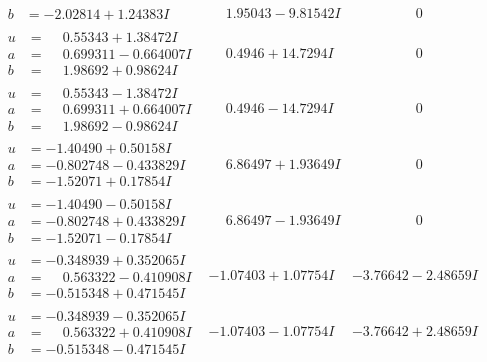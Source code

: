 \documentclass[1p]{elsarticle_modified}
\theoremstyle{definition}
\begin{document}
$$\begin{array}{c|c|c}
\begin{aligned}
b &= -2.02814 + 1.24383 I\end{aligned}
 & \phantom{-}1.95043 - 9.81542 I & \phantom{-0.000000 } 0 \\ \hline\begin{aligned}
u &= \phantom{-}0.55343 + 1.38472 I \\
a &= \phantom{-}0.699311 - 0.664007 I \\
b &= \phantom{-}1.98692 + 0.98624 I\end{aligned}
 & \phantom{-}0.4946 + 14.7294 I & \phantom{-0.000000 } 0 \\ \hline\begin{aligned}
u &= \phantom{-}0.55343 - 1.38472 I \\
a &= \phantom{-}0.699311 + 0.664007 I \\
b &= \phantom{-}1.98692 - 0.98624 I\end{aligned}
 & \phantom{-}0.4946 - 14.7294 I & \phantom{-0.000000 } 0 \\ \hline\begin{aligned}
u &= -1.40490 + 0.50158 I \\
a &= -0.802748 - 0.433829 I \\
b &= -1.52071 + 0.17854 I\end{aligned}
 & \phantom{-}6.86497 + 1.93649 I & \phantom{-0.000000 } 0 \\ \hline\begin{aligned}
u &= -1.40490 - 0.50158 I \\
a &= -0.802748 + 0.433829 I \\
b &= -1.52071 - 0.17854 I\end{aligned}
 & \phantom{-}6.86497 - 1.93649 I & \phantom{-0.000000 } 0 \\ \hline\begin{aligned}
u &= -0.348939 + 0.352065 I \\
a &= \phantom{-}0.563322 - 0.410908 I \\
b &= -0.515348 + 0.471545 I\end{aligned}
 & -1.07403 + 1.07754 I & -3.76642 - 2.48659 I \\ \hline\begin{aligned}
u &= -0.348939 - 0.352065 I \\
a &= \phantom{-}0.563322 + 0.410908 I \\
b &= -0.515348 - 0.471545 I\end{aligned}
 & -1.07403 - 1.07754 I & -3.76642 + 2.48659 I \\ \hline\begin{aligned}

\end{aligned}
\end{array}$$
\end{document}
